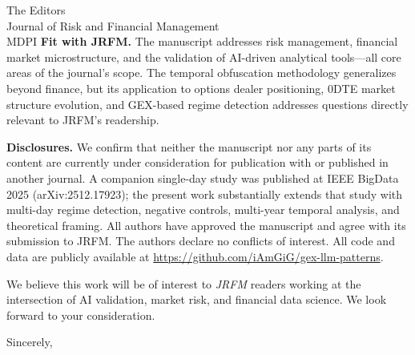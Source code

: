 \documentclass[11pt]{letter}
\begin{document}
\begin{letter}{The Editors \\ Journal of Risk and Financial Management \\ MDPI}
\textbf{Fit with JRFM.}
The manuscript addresses risk management, financial market microstructure, and the validation of AI-driven analytical tools---all core areas of the journal's scope. The temporal obfuscation methodology generalizes beyond finance, but its application to options dealer positioning, 0DTE market structure evolution, and GEX-based regime detection addresses questions directly relevant to JRFM's readership.

\textbf{Disclosures.}
We confirm that neither the manuscript nor any parts of its content are currently under consideration for publication with or published in another journal. A companion single-day study was published at IEEE BigData 2025 (arXiv:2512.17923); the present work substantially extends that study with multi-day regime detection, negative controls, multi-year temporal analysis, and theoretical framing. All authors have approved the manuscript and agree with its submission to JRFM. The authors declare no conflicts of interest. All code and data are publicly available at \url{https://github.com/iAmGiG/gex-llm-patterns}.

We believe this work will be of interest to \textit{JRFM} readers working at the intersection of AI validation, market risk, and financial data science. We look forward to your consideration.

\closing{Sincerely,}

\end{letter}
\end{document}

